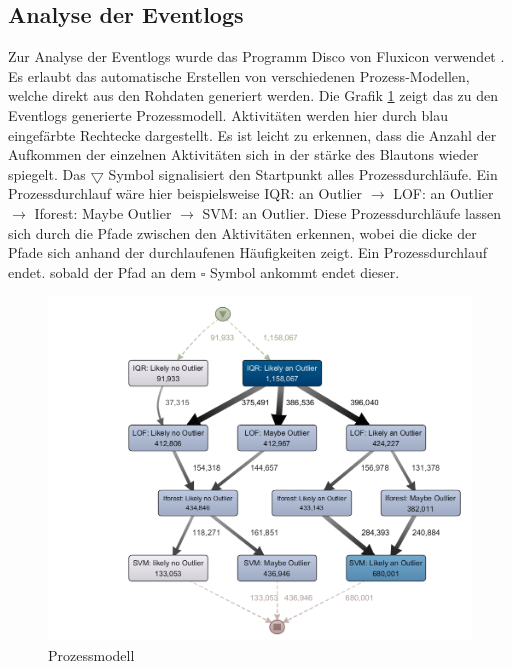 \subsection{Analyse der Eventlogs}
Zur Analyse der Eventlogs wurde das Programm Disco von Fluxicon verwendet \cite{ProcessMiningAutomated}. Es erlaubt das automatische Erstellen von verschiedenen Prozess-Modellen, welche direkt aus den Rohdaten generiert werden. Die Grafik \ref{fig:Prozessmodell} zeigt das zu den Eventlogs generierte Prozessmodell. Aktivitäten werden hier durch blau eingefärbte Rechtecke dargestellt. Es ist leicht zu erkennen, dass die Anzahl der Aufkommen der einzelnen Aktivitäten sich in der stärke des Blautons wieder spiegelt. Das $\bigtriangledown$ Symbol signalisiert den Startpunkt alles Prozessdurchläufe. Ein Prozessdurchlauf wäre hier beispielsweise IQR: an Outlier $\rightarrow$ LOF: an Outlier $\rightarrow$ Iforest: Maybe Outlier $\rightarrow$ SVM: an Outlier. Diese Prozessdurchläufe lassen sich durch die Pfade zwischen den Aktivitäten erkennen, wobei die dicke der Pfade sich anhand der durchlaufenen Häufigkeiten zeigt. Ein Prozessdurchlauf endet. sobald der Pfad an dem $\square$ Symbol ankommt endet dieser. 
\begin{figure}[hbt!]
	\includegraphics[width=\textwidth]{img/Prozessmodell.png}
	\caption[Prozessmodell]{Prozessmodell}
	\label{fig:Prozessmodell}
\end{figure}
 
\FloatBarrier 

